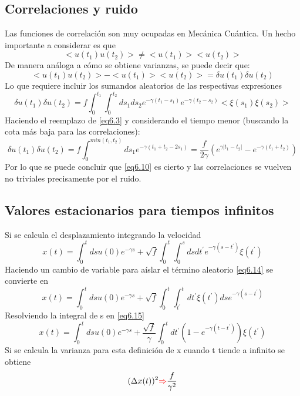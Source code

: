 \documentclass{book}
\begin{document}
\subsection{Correlaciones y ruido}
Las funciones de correlación son muy ocupadas en Mecánica Cuántica. Un hecho importante a considerar es que 
\begin{equation}\label{eq6.10} <u(t_1)u(t_2)>\neq<u(t_1)><u(t_2)>\end{equation}
De manera análoga a cómo se obtiene varianzas, se puede decir que:
\begin{equation}\label{eq6.11}<u(t_1)u(t_2)>-<u(t_1)><u(t_2)>=\delta u(t_1)\delta u(t_2)\end{equation}
Lo que requiere incluir los sumandos aleatorios de las respectivas expresiones
\begin{equation}\label{eq6.12}\delta u(t_1)\delta u(t_2)=f\int_0^{t_1}\int_0^{t_2}ds_1 ds_2 e^{-\gamma(t_1-s_1)}e^{-\gamma(t_2-s_2)}<\xi(s_1)\xi(s_2)>\end{equation}
Haciendo el reemplazo de \ref{eq6.3} y considerando el tiempo menor (buscando la cota más baja para las correlaciones):
\begin{equation}\label{eq6.13}\delta u(t_1)\delta u(t_2)=f\int_{0}^{min(t_1,t_2)}ds_1 e^{-\gamma(t_1+t_2-2s_1)}=\frac{f}{2\gamma}(e^{\gamma\lvert t_1-t_2\rvert}-e^{-\gamma(t_1+t_2)})\end{equation}
Por lo que se puede concluir que \ref{eq6.10} es cierto y las correlaciones se vuelven no triviales precisamente por el ruido.
\subsection{Valores estacionarios para tiempos infinitos}
Si se calcula el desplazamiento integrando la velocidad
\begin{equation}\label{eq6.14}x(t)=\int_0^t ds u(0)e^{-\gamma s}+\sqrt{f}\int_0^t\int_0^s ds dt^\prime e^{-\gamma(s-t^\prime)} \xi(t^\prime)\end{equation}
Haciendo un cambio de variable para aíslar el término aleatorio \ref{eq6.14} se convierte en 
\begin{equation}\label{eq6.15}x(t)=\int_0^t ds u(0)e^{-\gamma s}+\sqrt{f}\int_0^t \int_{t^\prime}^t dt^\prime \xi(t^\prime) ds e^{-\gamma (s-t^\prime)}\end{equation}
Resolviendo la integral de s en \ref{eq6.15}\begin{equation}\label{eq6.16}x(t)=\int_0^t ds u(0)e^{-\gamma s}+\frac{\sqrt{f}}{\gamma}\int_0^t d t^\prime (1-e^{-\gamma(t-t^\prime)})\xi(t^\prime)\end{equation} Si se calcula la varianza para esta definición de x cuando t tiende a infinito se obtiene
\begin{equation}\label{eq6.17} (\Delta x(t))^2 \textcolor{red}{\Rightarrow} \frac{f}{\gamma^2}\end{equation}
\end{document}
